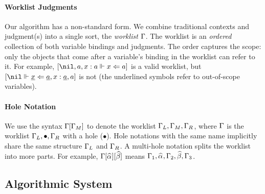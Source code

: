 \paragraph{Worklist Judgments} Our algorithm has a non-standard form.
We combine traditional contexts and judgment(s) into a single sort, the \emph{worklist} $\Gamma$.
The worklist is an \emph{ordered} collection of both variable bindings and judgments. The order captures the scope:
only the objects that come after a variable's binding in the worklist can refer to it.
For example, $[\nil, a, x:a \Vdash x \Lto a]$ is a valid worklist,
but $[\nil \Vdash \underline{x} \Lto \underline{a}, x:\underline{a}, a]$ is not
(the underlined symbols refer to out-of-scope variables).

\paragraph{Hole Notation}
We use the syntax $\Gamma[\Gamma_M]$ to denote the worklist $\Gamma_L,\Gamma_M,\Gamma_R$,
where $\Gamma$ is the worklist $\Gamma_L,\bullet,\Gamma_R$ with a hole ($\bullet$).
Hole notations with the same name implicitly share the same structure $\Gamma_L$ and $\Gamma_R$.
A multi-hole notation splits the worklist into more parts.
For example, $\Gm[\al][\bt]$ means $\Gm_1,\al,\Gm_2,\bt,\Gm_3$.

\subsection{Algorithmic System}

\newcommand \algrule {\stepcounter{algRuleCounter}\rrule{\arabic{algRuleCounter}}}

